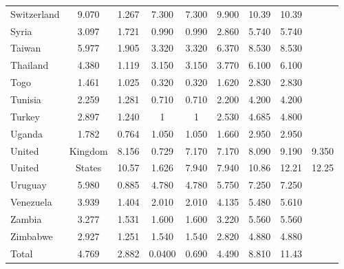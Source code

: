 \documentclass[]{article}
\begin{document}
\begin{tabular}{lcccccccc}
Switzerland & 9.070 & 1.267 & 7.300 & 7.300 & 9.900 & 10.39 & 10.39 &  \\
Syria & 3.097 & 1.721 & 0.990 & 0.990 & 2.860 & 5.740 & 5.740 &  \\
Taiwan & 5.977 & 1.905 & 3.320 & 3.320 & 6.370 & 8.530 & 8.530 &  \\
Thailand & 4.380 & 1.119 & 3.150 & 3.150 & 3.770 & 6.100 & 6.100 &  \\
Togo & 1.461 & 1.025 & 0.320 & 0.320 & 1.620 & 2.830 & 2.830 &  \\
Tunisia & 2.259 & 1.281 & 0.710 & 0.710 & 2.200 & 4.200 & 4.200 &  \\
Turkey & 2.897 & 1.240 & 1 & 1 & 2.530 & 4.685 & 4.800 &  \\
Uganda & 1.782 & 0.764 & 1.050 & 1.050 & 1.660 & 2.950 & 2.950 &  \\
United & Kingdom & 8.156 & 0.729 & 7.170 & 7.170 & 8.090 & 9.190 & 9.350 \\
United & States & 10.57 & 1.626 & 7.940 & 7.940 & 10.86 & 12.21 & 12.25 \\
Uruguay & 5.980 & 0.885 & 4.780 & 4.780 & 5.750 & 7.250 & 7.250 &  \\
Venezuela & 3.939 & 1.404 & 2.010 & 2.010 & 4.135 & 5.480 & 5.610 &  \\
Zambia & 3.277 & 1.531 & 1.600 & 1.600 & 3.220 & 5.560 & 5.560 &  \\
Zimbabwe & 2.927 & 1.251 & 1.540 & 1.540 & 2.820 & 4.880 & 4.880 &  \\
 Total & 4.769 & 2.882 & 0.0400 & 0.690 & 4.490 & 8.810 & 11.43 &  \\ \hline
\end{tabular}
\end{document}
